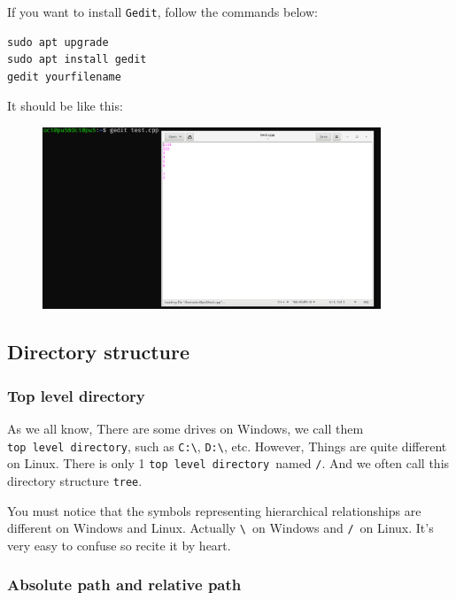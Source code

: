 \documentclass[12pt]{ctexart}
\begin{document}
If you want to install \texttt{Gedit}, follow the commands below:

\begin{adjustwidth}{2em}{0pt}
\begin{verbatim}
sudo apt upgrade
sudo apt install gedit
gedit yourfilename
\end{verbatim}
\end{adjustwidth}

It should be like this:

\begin{figure}[H]
    \centering
    \includegraphics[width=0.9\textwidth,keepaspectratio]{assets/Linux/1.3 How to edit files on Linux/7.png}
\end{figure}

\newpage
\subsection{\textbf{Directory structure}}

\subsubsection{\textbf{Top level directory}}

As we all know, There are some drives on Windows, we call them
\texttt{top\ level\ directory}, such as \texttt{C:\textbackslash{}},
\texttt{D:\textbackslash{}}, etc. However, Things are quite different on
Linux. There is only 1 \texttt{top\ level\ directory}\ named \texttt{/}.
And we often call this directory structure \texttt{tree}.

You must notice that the symbols representing hierarchical relationships
are different on Windows and Linux. Actually \texttt{\textbackslash{}}\
on Windows and \texttt{/}\ on Linux. It's very easy to
confuse so recite it by heart.

\subsubsection{\textbf{Absolute path and relative
path}}
\end{document}
